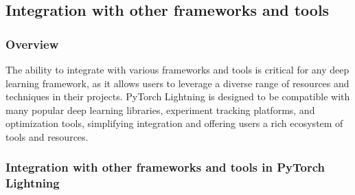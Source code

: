 \documentclass[12pt]{article}
\begin{document}
\subsection{Integration with other frameworks and tools}

\subsubsection{Overview}

The ability to integrate with various frameworks and tools is critical for any deep learning framework, as it allows users to leverage a diverse range of resources and techniques in their projects. PyTorch Lightning is designed to be compatible with many popular deep learning libraries, experiment tracking platforms, and optimization tools, simplifying integration and offering users a rich ecosystem of tools and resources.

\subsubsection{Integration with other frameworks and tools in PyTorch Lightning}
\end{document}
